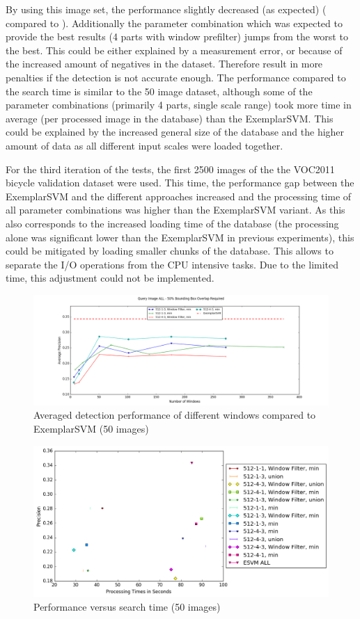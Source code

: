 By using this image set, the performance slightly decreased (as expected) ( compared to ). Additionally the parameter combination which was expected to provide the best results (4 parts with window prefilter) jumps from the worst to the best. This could be either explained by a measurement error, or because of the increased amount of negatives in the dataset. Therefore result in more penalties if the detection is not accurate enough. The performance compared to the search time is similar to the 50 image dataset, although some of the parameter combinations (primarily 4 parts, single scale range) took more time in average (per processed image in the database) than the ExemplarSVM. This could be explained by the increased general size of the database and the higher amount of data as all different input scales were loaded together.

For the third iteration of the tests, the first 2500 images of the the \ac{VOC2011} bicycle validation dataset were used. This time, the performance gap between the ExemplarSVM and the different approaches increased and the processing time of all parameter combinations was higher than the ExemplarSVM variant. As this also corresponds to the increased loading time of the database (the processing alone was significant lower than the ExemplarSVM in previous experiments), this could be mitigated by loading smaller chunks of the database. This allows to separate the I/O operations from the CPU intensive tasks. Due to the limited time, this adjustment could not be implemented.


\begin{figure}
\centering
\includegraphics[width=\linewidth]{images/db1_window_comparison-ALL}
\caption{Averaged detection performance of different windows compared to ExemplarSVM (50 images)}
\label{fig:db1_window_comparison-ALL}
\end{figure}


\begin{figure}
\centering
\includegraphics[width=0.7\linewidth]{images/db1_t_vs_p-ALL}
\caption{Performance versus search time (50 images)}
\label{fig:db1_t_vs_p-ALL}
\end{figure}

